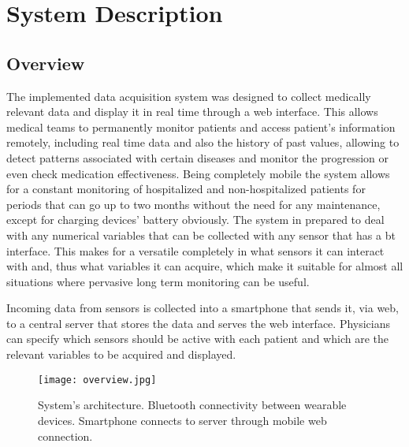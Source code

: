 
\chapter{System Description}
\label{chapter:description}

\section{Overview}

The implemented data acquisition system was designed to collect medically relevant data and display it in real time through a web interface. This allows medical teams to permanently monitor patients and access patient's information remotely, including real time data and also the history of past values, allowing to detect patterns associated with certain diseases and monitor the progression or even check medication effectiveness.
Being completely mobile the system allows for a constant monitoring of hospitalized and non-hospitalized patients for periods that can go up to two months without the need for any maintenance, except for charging devices' battery obviously.
The system in prepared to deal with any numerical variables that can be collected with any sensor that has a \ac{bt} interface. This makes for a versatile completely in what sensors it can interact with and, thus what variables it can acquire, which make it suitable for almost all situations where pervasive long term monitoring can be useful.

Incoming data from sensors is collected into a smartphone that sends it, via web, to a central server that stores the data and serves the web interface. Physicians can specify which sensors should be active with each patient and which are the relevant variables to be acquired and displayed.

\begin{figure}[!h]
	\centering
	\texttt{[image: overview.jpg]}
	\caption{System's architecture. Bluetooth connectivity between wearable devices. Smartphone connects to server through mobile web connection.}
	\label{fig:overview}
\end{figure}



